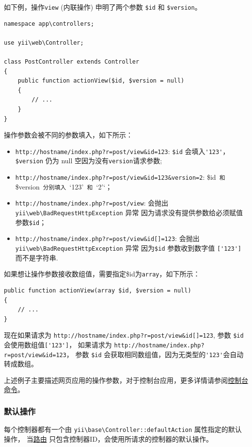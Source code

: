 如下例，操作\lstinline|view| (内联操作) 申明了两个参数 \lstinline|$id| 和 \lstinline|$version|。

\lstset{language=php}\begin{lstlisting}
namespace app\controllers;

use yii\web\Controller;

class PostController extends Controller
{
    public function actionView($id, $version = null)
    {
        // ...
    }
}
\end{lstlisting}
操作参数会被不同的参数填入，如下所示：

\begin{itemize}
\item \lstinline|http://hostname/index.php?r=post/view&id=123|: \lstinline|$id| 会填入\lstinline|'123'|，\lstinline|$version| 仍为 null 空因为没有\lstinline|version|请求参数;
\item \lstinline|http://hostname/index.php?r=post/view&id=123&version=2|: \$id\lstinline| 和 |\$version\lstinline| 分别填入 |`123'\lstinline| 和 |`2'`；
\item \lstinline|http://hostname/index.php?r=post/view|: 会抛出\texttt{yii{\allowbreak{}\textbackslash}web{\allowbreak{}\textbackslash}BadRequestHttpException} 异常
因为请求没有提供参数给必须赋值参数\lstinline|$id|；
\item \lstinline|http://hostname/index.php?r=post/view&id[]=123|: 会抛出\texttt{yii{\allowbreak{}\textbackslash}web{\allowbreak{}\textbackslash}BadRequestHttpException} 异常
因为\lstinline|$id| 参数收到数字值 \lstinline|['123']|而不是字符串.
\end{itemize}
如果想让操作参数接收数组值，需要指定\$id为\lstinline|array|，如下所示：

\lstset{language=php}\begin{lstlisting}
public function actionView(array $id, $version = null)
{
    // ...
}
\end{lstlisting}
现在如果请求为 \lstinline|http://hostname/index.php?r=post/view&id[]=123|, 参数 \lstinline|$id| 会使用数组值\lstinline|['123']|，
如果请求为 \lstinline|http://hostname/index.php?r=post/view&id=123|，
参数 \lstinline|$id| 会获取相同数组值，因为无类型的\lstinline|'123'|会自动转成数组。

上述例子主要描述网页应用的操作参数，对于控制台应用，更多详情请参阅\hyperref[tutorial-console.md]{控制台命令}。

\subsubsection{默认操作 \label{structure-controllers.md::default-action}}
每个控制器都有一个由 \texttt{yii{\allowbreak{}\textbackslash}base{\allowbreak{}\textbackslash}Controller\allowbreak{}::\allowbreak{}defaultAction} 属性指定的默认操作，
当\hyperref[structure-controllers.md::::ids-routes]{路由} 只包含控制器ID，会使用所请求的控制器的默认操作。

